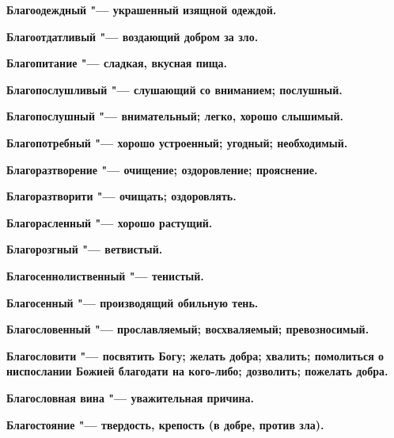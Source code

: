 \bfseries Благоодеждный \normalfont{} "--- украшенный изящной одеждой. 




\bfseries Благоотдатливый \normalfont{} "--- воздающий добром за зло. 




\bfseries Благопитание \normalfont{} "--- сладкая, вкусная пища. 




\bfseries Благопослушливый \normalfont{} "--- слушающий со вниманием; послушный. 




\bfseries Благопослушный \normalfont{} "--- внимательный; легко, хорошо слышимый. 




\bfseries Благопотребный \normalfont{} "--- хорошо устроенный; угодный; необходимый. 




\bfseries Благоразтворение \normalfont{} "--- очищение; оздоровление; прояснение. 




\bfseries Благоразтворити \normalfont{} "--- очищать; оздоровлять. 




\bfseries Благорасленный \normalfont{} "--- хорошо растущий. 




\bfseries Благорозгный \normalfont{} "--- ветвистый. 




\bfseries Благосеннолиственный \normalfont{} "--- тенистый. 




\bfseries Благосенный \normalfont{} "--- производящий обильную тень. 




\bfseries Благословенный \normalfont{} "--- прославляемый; восхваляемый; превозносимый. 




\bfseries Благословити \normalfont{} "--- посвятить Богу; желать добра; хвалить; помолиться о ниспослании Божией благодати на кого-либо; дозволить; пожелать добра. 




\bfseries Благословная вина \normalfont{} "--- уважительная причина. 




\bfseries Благостояние \normalfont{} "--- твердость, крепость (в добре, против зла). 




